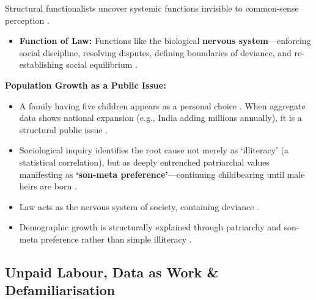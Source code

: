 \begin{KeyConcept}
Structural functionalists uncover systemic functions invisible to common-sense perception .
\begin{itemize}
    \item \textbf{Function of Law:} Functions like the biological \textbf{nervous system}---enforcing social discipline, resolving disputes, defining boundaries of deviance, and re-establishing social equilibrium .
\end{itemize}
\end{KeyConcept}

\begin{ExampleBox}
\textbf{Population Growth as a Public Issue:}
\begin{itemize}
    \item A family having five children appears as a personal choice . When aggregate data shows national expansion (e.g., India adding millions annually), it is a structural public issue .
    \item Sociological inquiry identifies the root cause not merely as `illiteracy' (a statistical correlation), but as deeply entrenched patriarchal values manifesting as \textbf{`son-meta preference'}---continuing childbearing until male heirs are born .
\end{itemize}
\end{ExampleBox}

\begin{QuickRevision}
\begin{itemize}
    \item Law acts as the nervous system of society, containing deviance .
    \item Demographic growth is structurally explained through patriarchy and son-meta preference rather than simple illiteracy .
\end{itemize}
\end{QuickRevision}

\subsection{Unpaid Labour, Data as Work \& Defamiliarisation}

